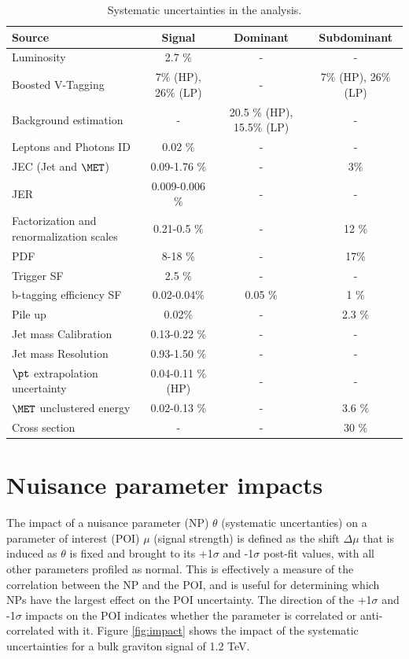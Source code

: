 \begin{table}[!ht]
\begin{footnotesize}
\centering
\caption{Systematic uncertainties in the analysis.}
\label{tab:SystUncert}
\begin{tabular}{lccc}\hline
 Source  &  Signal  & Dominant  & Subdominant  \\ \hline
 Luminosity &  2.7 $\%$ & - & - \\
 Boosted V-Tagging  & 7$\%$ (HP), 26$\%$ (LP) & - &  7$\%$ (HP), 26$\%$ (LP) \\
 Background estimation & - &  20.5 $\%$ (HP), 15.5$\%$ (LP) & - \\
 Leptons and Photons ID &  0.02 $\%$  & - & -\\
 JEC (Jet and $\MET$) &   0.09-1.76 $\%$  & - & 3$\%$ \\
 JER &   0.009-0.006 $\%$  & - &- \\
 Factorization and renormalization scales &  0.21-0.5 $\%$ & - & 12 $\%$ \\
 PDF &   8-18 $\%$ & - & 17$\%$\\
 Trigger SF & 2.5 $\%$ & - & - \\
 b-tagging efficiency SF &  0.02-0.04$\%$ & 0.05 $\%$  & 1 $\%$  \\
 Pile up &  0.02$\%$  & - & 2.3 $\%$  \\
 Jet mass Calibration & 0.13-0.22 $\%$ & - & - \\
 Jet mass Resolution &  0.93-1.50 $\%$ & - & - \\
 $\pt$ extrapolation uncertainty & 0.04-0.11 $\%$ (HP) & - & - \\
 $\MET$ unclustered energy & 0.02-0.13 $\%$   & -  &  3.6 $\%$ \\
Cross section & -    & -  &  30 $\%$ \\ \hline
\end{tabular}
\end{footnotesize}
\end{table}


\section{Nuisance parameter impacts}

The impact of a nuisance parameter (NP) $\theta$  (systematic uncertanties) on a parameter of interest (POI) $\mu$ (signal strength) is defined as the shift $\Delta \mu$ that is induced as $\theta$ is fixed and brought to its +1$\sigma$ and -1$\sigma$  post-fit values, with all other parameters profiled as normal. This is effectively a measure of the correlation between the NP and the POI, and is useful for determining which NPs have the largest effect on the POI uncertainty. 
The direction of the +1$\sigma$ and -1$\sigma$ impacts on the POI indicates whether the parameter is correlated or anti-correlated with it. Figure \ref{fig:impact} shows the impact of the systematic uncertainties for a bulk graviton signal of 1.2 TeV. 


